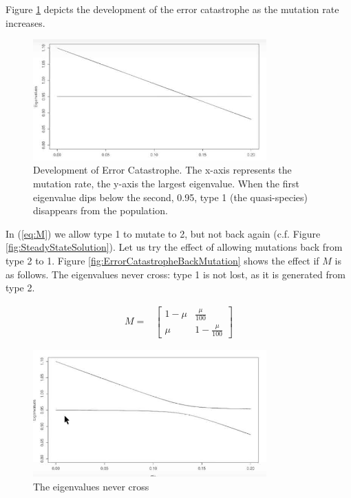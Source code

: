 \documentclass[]{article}
\begin{document}
Figure \ref{fig:ErrorCatastropheMu} depicts the development of the error catastrophe as the mutation rate increases.
\begin{figure}[H]
	\caption[Development of Error Catastrophe]{Development of Error Catastrophe. The x-axis represents the mutation rate, the y-axis the largest eigenvalue. When the first eigenvalue dips below the second, 0.95, type 1 (the quasi-species) disappears from the population.}\label{fig:ErrorCatastropheMu}
	\includegraphics[width=0.8\textwidth]{ErrorCatastropheMu}
\end{figure}

In (\ref{eq:M}) we allow type 1 to mutate to 2, but not back again (c.f. Figure \ref{fig:SteadyStateSolution}). Let us try the effect of allowing mutations back from type 2 to 1. Figure \ref{fig:ErrorCatastropheBackMutation} shows the effect if $M$ is as follows. The eigenvalues never cross: type 1 is not lost, as it is generated from type 2.

\begin{align*}
	M =& \begin{bmatrix}
		1-\mu&\frac{\mu}{100}\\
		\mu&1-\frac{\mu}{100}
	\end{bmatrix}
\end{align*}

\begin{figure}[H]
	\caption[The eigenvalues never cross]{The eigenvalues never cross}\label{eq:ErrorCatastropheBackMutation}
	\includegraphics[width=0.8\textwidth]{ErrorCatastropheBackMutation}
\end{figure}
\end{document}
